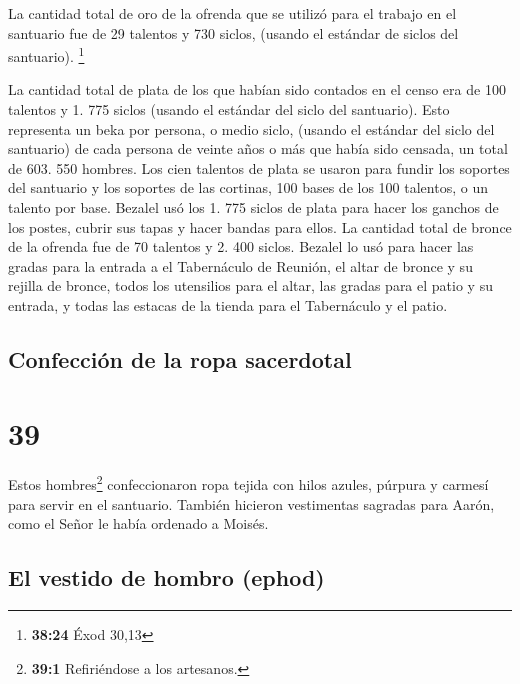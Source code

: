  La cantidad total de oro de la ofrenda que se utilizó
para el trabajo en el santuario fue de 29 talentos y 730 siclos, (usando
el estándar de siclos del santuario). \footnote{\textbf{38:24} Éxod
  30,13}

 La cantidad total de plata de los que habían sido
contados en el censo era de 100 talentos y 1. 775 siclos (usando el
estándar del siclo del santuario).  Esto representa un
beka por persona, o medio siclo, (usando el estándar del siclo del
santuario) de cada persona de veinte años o más que había sido censada,
un total de 603. 550 hombres.  Los cien talentos de plata
se usaron para fundir los soportes del santuario y los soportes de las
cortinas, 100 bases de los 100 talentos, o un talento por base.
 Bezalel usó los 1. 775 siclos de plata para hacer los
ganchos de los postes, cubrir sus tapas y hacer bandas para ellos.
 La cantidad total de bronce de la ofrenda fue de 70
talentos y 2. 400 siclos.  Bezalel lo usó para hacer las
gradas para la entrada a el Tabernáculo de Reunión, el altar de bronce y
su rejilla de bronce, todos los utensilios para el altar,
 las gradas para el patio y su entrada, y todas las
estacas de la tienda para el Tabernáculo y el patio.

\hypertarget{confecciuxf3n-de-la-ropa-sacerdotal}{%
\subsection{Confección de la ropa
sacerdotal}\label{confecciuxf3n-de-la-ropa-sacerdotal}}

\hypertarget{section-38}{%
\section{39}\label{section-38}}

 Estos hombres\footnote{\textbf{39:1} Refiriéndose a los
  artesanos.} confeccionaron ropa tejida con hilos azules, púrpura y
carmesí para servir en el santuario. También hicieron vestimentas
sagradas para Aarón, como el Señor le había ordenado a Moisés.

\hypertarget{el-vestido-de-hombro-ephod-1}{%
\subsection{El vestido de hombro
(ephod)}\label{el-vestido-de-hombro-ephod-1}}

